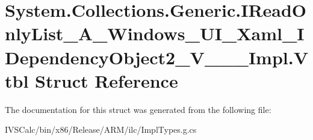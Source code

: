 \hypertarget{struct_system_1_1_collections_1_1_generic_1_1_i_read_only_list___a___windows___u_i___xaml___i_def910aa33d5cd90654ff50c1d234f2d2d}{}\section{System.\+Collections.\+Generic.\+I\+Read\+Only\+List\+\_\+\+A\+\_\+\+Windows\+\_\+\+U\+I\+\_\+\+Xaml\+\_\+\+I\+Dependency\+Object2\+\_\+\+V\+\_\+\+\_\+\+\_\+\+Impl.\+Vtbl Struct Reference}
\label{struct_system_1_1_collections_1_1_generic_1_1_i_read_only_list___a___windows___u_i___xaml___i_def910aa33d5cd90654ff50c1d234f2d2d}


The documentation for this struct was generated from the following file\+:\begin{DoxyCompactItemize}
\item 
I\+V\+S\+Calc/bin/x86/\+Release/\+A\+R\+M/ilc/Impl\+Types.\+g.\+cs\end{DoxyCompactItemize}
